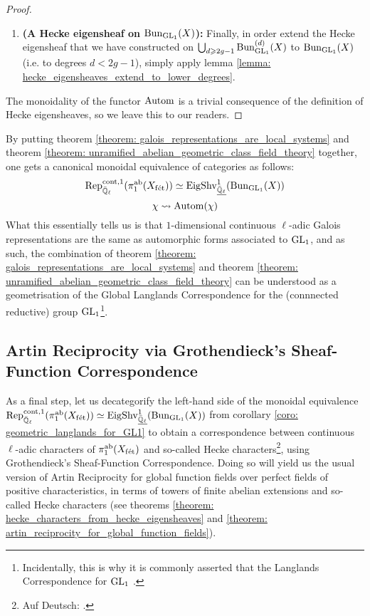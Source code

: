 \begin{proof}
\begin{enumerate}
                        \item \textbf{(A Hecke eigensheaf on $\mathrm{Bun}_{\operatorname{GL}_1}(X)$):} Finally, in order extend the Hecke eigensheaf that we have constructed on $\bigcup_{d \geqslant 2g - 1} \mathrm{Bun}_{\operatorname{GL}_1}^{(d)}(X)$ to $\mathrm{Bun}_{\operatorname{GL}_1}(X)$ (i.e. to degrees $d < 2g - 1$), simply apply lemma \ref{lemma: hecke_eigensheaves_extend_to_lower_degrees}.
                    \end{enumerate}
                The monoidality of the functor $\mathrm{Autom}$ is a trivial consequence of the definition of Hecke eigensheaves, so we leave this to our readers.
            \end{proof}
        
        \begin{corollary} \label{coro: geometric_langlands_for_GL1}
            By putting theorem \ref{theorem: galois_representations_are_local_systems} and theorem \ref{theorem: unramified_abelian_geometric_class_field_theory} together, one gets a canonical monoidal equivalence of categories as follows:
                $$\mathrm{Rep}^{\mathrm{cont}, 1}_{\bar{\mathbb{Q}}_{\ell}}(\pi_1^{\mathrm{ab}}(X_{\mathrm{f\acute{e}t}})) \simeq \mathrm{Eig}\mathrm{Shv}_{\underline{\bar{\mathbb{Q}}_{\ell}}}^1(\mathrm{Bun}_{\operatorname{GL}_1}(X))$$
                $$\chi \leadsto \mathrm{Autom}(\chi)$$
            What this essentially tells us is that $1$-dimensional continuous $\ell$-adic Galois representations are the same as automorphic forms associated to $\operatorname{GL}_1$, and as such, the combination of theorem \ref{theorem: galois_representations_are_local_systems} and theorem \ref{theorem: unramified_abelian_geometric_class_field_theory} can be understood as a geometrisation of the Global Langlands Correspondence for the (connnected reductive) group $\operatorname{GL}_1$\footnote{Incidentally, this is why it is commonly asserted that the Langlands Correspondence for $\operatorname{GL}_1$ .}. 
        \end{corollary}
        
    \subsection{Artin Reciprocity via Grothendieck's Sheaf-Function Correspondence}
        As a final step, let us decategorify the left-hand side of the monoidal equivalence $\mathrm{Rep}^{\mathrm{cont}, 1}_{\bar{\mathbb{Q}}_{\ell}}(\pi_1^{\mathrm{ab}}(X_{\mathrm{f\acute{e}t}})) \simeq \mathrm{Eig}\mathrm{Shv}_{\underline{\bar{\mathbb{Q}}_{\ell}}}^1(\mathrm{Bun}_{\operatorname{GL}_1}(X))$ from corollary \ref{coro: geometric_langlands_for_GL1} to obtain a correspondence between continuous $\ell$-adic characters of $\pi_1^{\mathrm{ab}}(X_{\mathrm{f\acute{e}t}})$ and so-called Hecke characters\footnote{Auf Deutsch: .}, using Grothendieck's Sheaf-Function Correspondence. Doing so will yield us the usual version of Artin Reciprocity for global function fields over perfect fields of positive characteristics, in terms of towers of finite abelian extensions and so-called Hecke characters (see theorems \ref{theorem: hecke_characters_from_hecke_eigensheaves} and \ref{theorem: artin_reciprocity_for_global_function_fields}).
        
